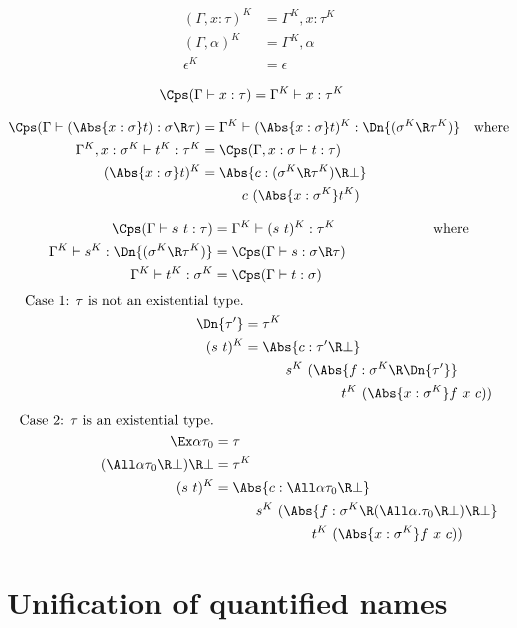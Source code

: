 \documentclass{amsart}
\begin{document}
\begin{align*}
(\Gamma, x:\tau)^K & =
  \Gamma^K, x:\tau^K
  \\
(\Gamma, \alpha)^K & =
  \Gamma^K, \alpha
  \\
\epsilon^K & =
  \epsilon
\end{align*}

\begin{align*}
\Cps(\Gamma \vdash x : \tau) & =
  \Gamma^K \vdash x : \tau^K
\end{align*}

\def\ONE{\hspace{3em}}
\def\TWO{\hspace{7em}}
\begin{align*}
\Cps(\Gamma \vdash (\Abs{x:\sigma}t) : \sigma \R \tau) & =
  \Gamma^K \vdash (\Abs{x:\sigma}t)^K : \Dn{(\sigma^K \R \tau^K)} &
  \mbox{where}
  \\
\Gamma^K,x:\sigma^K \vdash t^K : \tau^K & =
  \Cps(\Gamma,x:\sigma \vdash t : \tau)
  \\
(\Abs{x:\sigma}t)^K & =
  \Abs{c : (\sigma^K \R \tau^K) \R \bot} \\
  &\ONE c~(\Abs{x : \sigma^K} t^K)
\end{align*}

\begin{align*}
\Cps(\Gamma \vdash s~t : \tau) & =
  \Gamma^K \vdash (s~t)^K : \tau^K
  \TWO \mbox{where}
  \\
\Gamma^K \vdash s^K : \Dn{(\sigma^K \R \tau^K)} & =
  \Cps(\Gamma \vdash s : \sigma \R \tau)
  \\
\Gamma^K \vdash t^K : \sigma^K & =
  \Cps(\Gamma \vdash t : \sigma)
\end{align*}
\begin{align*}
\mbox{Case 1: $\tau$ is not an existential type.} & \\
\Dn{\tau'} & = \tau^K
  \\
(s~t)^K & =
  \Abs{c : \tau' \R \bot} \\
  &\ONE s^K~(\Abs{f : \sigma^K \R \Dn{\tau'}} \\
  &\TWO t^K~(\Abs{x : \sigma^K} f~x~c))
\end{align*}
\begin{align*}
\mbox{Case 2: $\tau$ is an existential type.} & \\
\Ex\alpha \tau_0 & = \tau
  \\
(\All\alpha \tau_0 \R \bot) \R \bot & = \tau^K
  \\
(s~t)^K & =
  \Abs{c : \All\alpha \tau_0 \R \bot} \\
  &\ONE s^K~(\Abs{f : \sigma^K \R
                      (\All\alpha. \tau_0 \R \bot) \R \bot} \\
  &\TWO t^K~(\Abs{x : \sigma^K} f~x~c))
\end{align*}


\section{Unification of quantified names}
\label{sec:unify}
\end{document}
